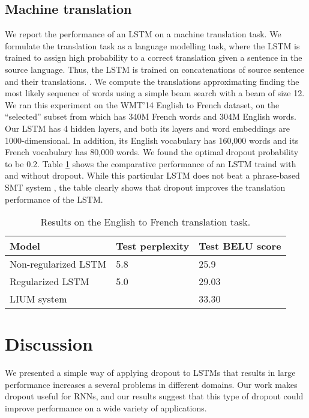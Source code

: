 \documentclass{article}
\begin{document}
\subsection{Machine translation}
\label{sec:trans}

We report the performance of an LSTM on a machine translation task.
We formulate the translation task as a language modelling task, where
the LSTM is trained to assign high probability to a correct
translation given a sentence in the source language.  Thus, the LSTM is trained on
concatenations of source sentence and their translations. %
\cite{cho2014learning}. We compute the translations 
approximating finding the most likely sequence of words
using a simple beam search with a beam of size 12.  We ran this
experiment on the WMT'14 English to French dataset, on the
``selected'' subset from \citet{wmt_joint} which has 340M French words
and 304M English words.  Our LSTM has 4 hidden layers, and both its
layers and word embeddings are 1000-dimensional. In addition, its 
English vocabulary has 160,000 words and its French vocabulary has
80,000 words. We found the optimal dropout probability to be 0.2.
Table \ref{tab:mt} shows the comparative performance of an LSTM traind with and without dropout.
While this particular LSTM does not beat a phrase-based SMT system
\cite{lium}, the table clearly shows that dropout improves the
translation performance of the LSTM.

\begin{table}[t]
  \small
  \centering
  \renewcommand{\arraystretch}{1.15}
  \begin{tabular}{lll}
    \hline
     Model & Test perplexity & Test BELU score \\
    \hline
    Non-regularized LSTM & 5.8 & 25.9 \\
    Regularized LSTM & 5.0 &  29.03 \\
    \hline
    LIUM system &  &  33.30 \\
    \hline
  \end{tabular}
  \caption{Results on the English to French translation task. }
  \label{tab:mt}
\end{table}



\section{Discussion}

We presented a simple way of applying dropout to LSTMs that results in
large performance increases a several problems in different domains.  Our work
makes dropout useful for RNNs, and our results suggest that this type of dropout could improve
performance on a wide variety of applications.



\small


\end{document}
